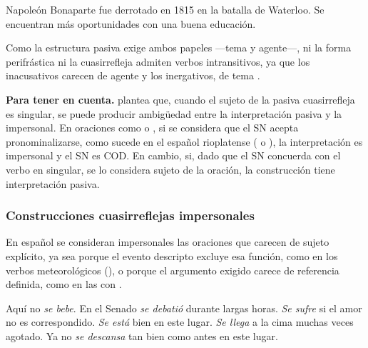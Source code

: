 \begin{exe}
  \ex\label{ex:10-napoleon} Napoleón Bonaparte fue derrotado en 1815 en la
      batalla de Waterloo.
  \ex\label{ex:10-oportunidades} Se encuentran más oportunidades con una buena
      educación.
\end{exe}

Como la estructura pasiva exige ambos papeles ---tema y agente---, ni la forma
perifrástica ni la cuasirrefleja admiten verbos intransitivos, ya que los
inacusativos carecen de agente y los inergativos, de tema
\parencite{giammatteo2010}.

\begin{destacado}
\textbf{Para tener en cuenta.} \textcite{ditullio2014} plantea que, cuando el
sujeto de la pasiva cuasirrefleja es singular, se puede producir ambigüedad entre
la interpretación pasiva y la impersonal. En oraciones como  o , si se
considera que el SN acepta pronominalizarse, como sucede en el español
rioplatense ( o ), la interpretación
es impersonal y el SN es COD. En cambio, si, dado que el SN concuerda con el
verbo en singular, se lo considera sujeto de la oración, la construcción tiene
interpretación pasiva.
\end{destacado}

\subsubsection{Construcciones cuasirreflejas impersonales}\label{sec:10-impersonales}

En español se consideran impersonales las oraciones que carecen de sujeto
explícito, ya sea porque el evento descripto excluye esa función, como en los
verbos meteorológicos (), o porque el argumento
exigido carece de referencia definida, como en las  con .

\begin{exe}
  \ex\label{ex:10-bebe} Aquí no \textit{se bebe}.
  \ex\label{ex:10-senado} En el Senado \textit{se debatió} durante largas horas.
  \ex\label{ex:10-sufre} \textit{Se sufre} si el amor no es correspondido.
  \ex\label{ex:10-esta} \textit{Se está} bien en este lugar.
  \ex\label{ex:10-cima} \textit{Se llega} a la cima muchas veces agotado.
  \ex\label{ex:10-descansa} Ya no \textit{se descansa} tan bien como antes en
      este lugar.
\end{exe}

